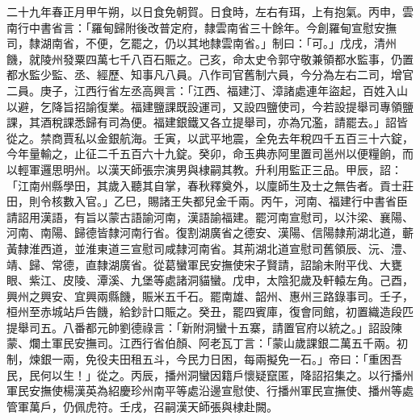 
\begin{pinyinscope}

 二十九年春正月甲午朔，以日食免朝賀。日食時，左右有珥，上有抱氣。丙申，雲南行中書省言：「羅甸歸附後改普定府，隸雲南省三十餘年。今創羅甸宣慰安撫司，隸湖南省，不便，乞罷之，仍以其地隸雲南省。」制曰：「可。」戊戌，清州饑，就陵州發粟四萬七千八百石賑之。己亥，命太史令郭守敬兼領都水監事，仍置都水監少監、丞、經歷、知事凡八員。八作司官舊制六員，今分為左右二司，增官二員。庚子，江西行省左丞高興言：「江西、福建汀、漳諸處連年盜起，百姓入山以避，乞降旨招諭復業。福建鹽課既設運司，又設四鹽使司，今若設提舉司專領鹽課，其酒稅課悉歸有司為便。福建銀鐵又各立提舉司，亦為冗濫，請罷去。」詔皆從之。禁商賈私以金銀航海。壬寅，以武平地震，全免去年稅四千五百三十六錠，今年量輸之，止征二千五百六十九錠。癸卯，命玉典赤阿里置司邕州以便糧餉，而以輕軍邏思明州。以漢天師張宗演男與棣嗣其教。升利用監正三品。甲辰，詔：「江南州縣學田，其歲入聽其自掌，春秋釋奠外，以廩師生及士之無告者。貢士莊田，則令核數入官。」乙巳，賜諸王失都兒金千兩。丙午，河南、福建行中書省臣請詔用漢語，有旨以蒙古語諭河南，漢語諭福建。罷河南宣慰司，以汴梁、襄陽、河南、南陽、歸德皆隸河南行省。復割湖廣省之德安、漢陽、信陽隸荊湖北道，蘄黃隸淮西道，並淮東道三宣慰司咸隸河南省。其荊湖北道宣慰司舊領辰、沅、澧、靖、歸、常德，直隸湖廣省。從葛蠻軍民安撫使宋子賢請，詔諭未附平伐、大甕眼、紫江、皮陵、潭溪、九堡等處諸洞貓蠻。戊申，太陰犯歲及軒轅左角。己酉，興州之興安、宜興兩縣饑，賑米五千石。罷南雄、韶州、惠州三路錄事司。壬子，桓州至赤城站戶告饑，給鈔計口賑之。癸丑，罷四賓庫，復會同館，初置織造段匹提舉司五。八番都元帥劉德祿言：「新附洞蠻十五寨，請置官府以統之。」詔設陳蒙、爛土軍民安撫司。江西行省伯顏、阿老瓦丁言：「蒙山歲課銀二萬五千兩。初制，煉銀一兩，免役夫田租五斗，今民力日困，每兩擬免一石。」帝曰：「重困吾民，民何以生！」從之。丙辰，播州洞蠻因籍戶懷疑竄匿，降詔招集之。以行播州軍民安撫使楊漢英為紹慶珍州南平等處沿邊宣慰使、行播州軍民宣撫使、播州等處管軍萬戶，仍佩虎符。壬戌，召嗣漢天師張與棣赴闕。




\end{pinyinscope}
